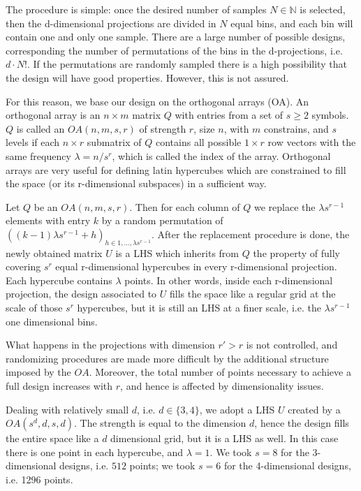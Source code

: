 \documentclass{article}
\begin{document}
The procedure is simple: once the desired number of samples $N\in\mathbb N$ is selected, then the d-dimensional projections are divided in $N$ equal bins, and each bin will contain one and only one sample. There are a large number of possible designs, corresponding the number of permutations of the bins in the d-projections, i.e. $d\cdot N!$. If the permutations are randomly sampled there is a high possibility that the design will have good properties. However, this is not assured.

For this reason, we base our design on the orthogonal arrays (OA). An orthogonal array is an $n\times m$ matrix $Q$ with entries from a set of $s\ge 2 $ symbols. $Q$ is called an $OA(n,m,s,r)$ of strength $r$, size $n$, with $m$ constrains, and $s$ levels if each $n\times r$ submatrix of $Q$ contains all possible $1\times r$ row vectors with the same frequency $\lambda=n/s^r$, which is called the index of the array. Orthogonal arrays are very useful for defining latin hypercubes which are constrained to fill the space (or its r-dimensional subspaces) in a sufficient way.

Let $Q$ be an $OA(n,m,s,r)$. Then for each column of $Q$ we replace the $\lambda s^{r-1}$ elements with entry $k$ by a random permutation of $\left((k-1)\lambda s^{r-1} + h\right)_{h\in 1,\dots, \lambda s^{r-1}}$. After the replacement procedure is done, the newly obtained matrix $U$ is a LHS which inherits from $Q$ the property of fully covering $s^r$ equal r-dimensional hypercubes in every r-dimensional projection. Each hypercube contains $\lambda$ points. In other words, inside each r-dimensional projection, the design associated to $U$ fills the space like a regular grid at the scale of those $s^r$ hypercubes, but it is still an LHS at a finer scale, i.e. the $\lambda s^{r-1}$ one dimensional bins.

What happens in the projections with dimension $r'>r$ is not controlled, and randomizing procedures are made more difficult by the additional structure imposed by the $OA$. Moreover, the total number of points necessary to achieve a full design increases with $r$, and hence is affected by dimensionality issues.

Dealing with relatively small $d$, i.e. $d\in\{3,4\}$, we adopt a LHS $U$ created by a $OA(s^d,d,s,d)$. The strength is equal to the dimension $d$, hence the design fills the entire space like a $d$ dimensional grid, but it is a LHS as well. In this case there is one point in each hypercube, and $\lambda=1$. We took $s=8$ for the 3-dimensional designs, i.e. $512$ points; we took $s=6$ for the 4-dimensional designs, i.e. 1296 points.
\end{document}
